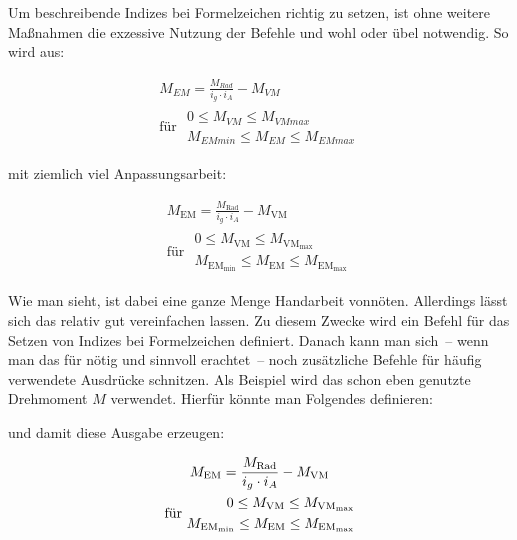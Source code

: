 \documentclass[english,ngerman]{tudscrartcl}
\begin{document}
Um beschreibende Indizes bei Formelzeichen richtig zu setzen, ist ohne weitere 
Maßnahmen die exzessive Nutzung der Befehle \PParameter{\dots} 
und \PParameter{\dots} wohl oder übel notwendig. So wird aus:
%
\begin{Tutorial}
\begin{equation*}
\begin{gathered}
M_{EM} = \frac{M_{Rad}}{i_g \cdot i_A} - M_{VM} \\
\textrm{für }
\begin{aligned}
0\leq M_{VM}\leq M_{VMmax} \\ 
M_{EMmin}\leq M_{EM}\leq M_{EMmax}
\end{aligned}
\end{gathered}
\end{equation*}
\end{Tutorial}
%
mit ziemlich viel Anpassungsarbeit:
%
\begin{Tutorial}
\begin{equation*}
\begin{gathered}
M_\mathrm{EM} = \frac{M_\mathrm{Rad}}{i_g \cdot i_A} - M_\mathrm{VM} \\
\textrm{für }
\begin{aligned}
0\leq M_\mathrm{VM}\leq M_\mathrm{VM_{max}} \\ 
M_\mathrm{EM_{min}}\leq M_\mathrm{EM}\leq M_\mathrm{EM_{max}}
\end{aligned}
\end{gathered}
\end{equation*}
\end{Tutorial}
%
Wie man sieht, ist dabei eine ganze Menge Handarbeit vonnöten. Allerdings lässt 
sich das relativ gut vereinfachen lassen. Zu diesem Zwecke wird ein Befehl 
\PParameter{\dots} für das Setzen von Indizes bei Formelzeichen 
definiert. Danach kann man sich~-- wenn man das für nötig und sinnvoll 
erachtet~-- noch zusätzliche Befehle für häufig verwendete Ausdrücke schnitzen. 
Als Beispiel wird das schon eben genutzte Drehmoment \ensuremath{M} verwendet. 
Hierfür könnte man Folgendes definieren:
%
\begin{Tutorial}
\newcommand*{\ind}[1]{\ensuremath{_\mathrm{#1}}}
\newcommand*{\M}[1]{\ensuremath{M\ind{#1}}}
\end{Tutorial}
%
und damit diese Ausgabe erzeugen:
%
\begin{Tutorial}
\begin{equation*}
\begin{gathered}
\M{EM} = \frac{\M{Rad}}{i_g \cdot i_A} - \M{VM} \\
\textrm{für }
\begin{aligned}
0\leq \M{VM}\leq \M{VM_{max}} \\ 
\M{EM_{min}}\leq \M{EM}\leq \M{EM_{max}}
\end{aligned}
\end{gathered}
\end{equation*}
\end{Tutorial}
\end{document}
